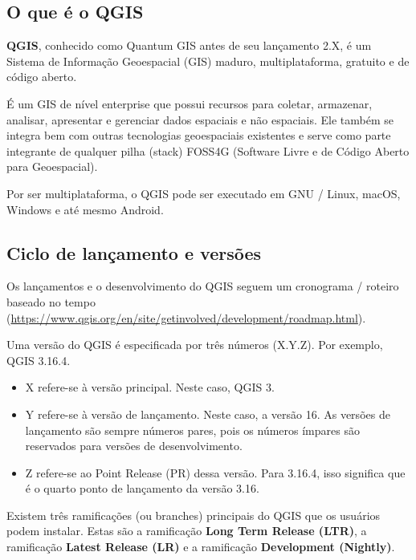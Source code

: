 \documentclass[
]{krantz}
\providecommand{\tightlist}{%
  \setlength{\itemsep}{0pt}\setlength{\parskip}{0pt}}
\begin{document}
\hypertarget{o-que-uxe9-o-qgis}{%
\subsection{O que é o QGIS}\label{o-que-uxe9-o-qgis}}

\textbf{QGIS}, conhecido como Quantum GIS antes de seu lançamento 2.X, é um Sistema de Informação Geoespacial (GIS) maduro, multiplataforma, gratuito e de código aberto.

É um GIS de nível enterprise que possui recursos para coletar, armazenar, analisar, apresentar e gerenciar dados espaciais e não espaciais. Ele também se integra bem com outras tecnologias geoespaciais existentes e serve como parte integrante de qualquer pilha (stack) FOSS4G (Software Livre e de Código Aberto para Geoespacial).

Por ser multiplataforma, o QGIS pode ser executado em GNU / Linux, macOS, Windows e até mesmo Android.

\hypertarget{ciclo-de-lanuxe7amento-e-versuxf5es}{%
\subsection{Ciclo de lançamento e versões}\label{ciclo-de-lanuxe7amento-e-versuxf5es}}

Os lançamentos e o desenvolvimento do QGIS seguem um cronograma / roteiro baseado no tempo (\href{https://www.qgis.org/en/site/\%20getinvolved\%20/\%20development\%20/\%20roadmap.html}{https://www.qgis.org/en/site/getinvolved/development/roadmap.html}).

Uma versão do QGIS é especificada por três números (X.Y.Z). Por exemplo, QGIS 3.16.4.

\begin{itemize}
\tightlist
\item
  X refere-se à versão principal. Neste caso, QGIS 3.
\item
  Y refere-se à versão de lançamento. Neste caso, a versão 16. As versões de lançamento são sempre números pares, pois os números ímpares são reservados para versões de desenvolvimento.
\item
  Z refere-se ao Point Release (PR) dessa versão. Para 3.16.4, isso significa que é o quarto ponto de lançamento da versão 3.16.
\end{itemize}

Existem três ramificações (ou branches) principais do QGIS que os usuários podem instalar. Estas são a ramificação \textbf{Long Term Release (LTR)}, a ramificação \textbf{Latest Release (LR)} e a ramificação \textbf{Development (Nightly)}.
\end{document}

